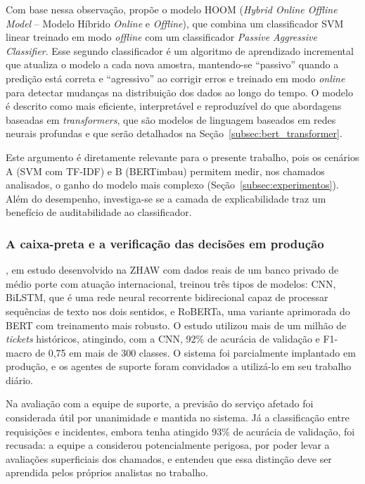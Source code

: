 \documentclass[
    12pt,                %
    openright,           %
    oneside,             %
    a4paper,             %
    english,             %
    brazil               %
]{abntex2}
\begin{document}
Com base nessa observação,  propõe o modelo HOOM (\textit{Hybrid Online Offline Model} -- Modelo Híbrido \textit{Online} e \textit{Offline}), que combina um classificador SVM linear treinado em modo \textit{offline} com um classificador \textit{Passive Aggressive Classifier}. Esse segundo classificador 
é um algoritmo de aprendizado incremental que atualiza o modelo a cada nova amostra, mantendo-se ``passivo'' quando a predição está correta e ``agressivo'' ao corrigir erros e treinado em modo 
\textit{online} para detectar mudanças na distribuição dos dados ao longo do tempo. O modelo é descrito como mais eficiente, interpretável e reproduzível 
do que abordagens baseadas em \textit{transformers}, que são modelos 
de linguagem baseados em redes neurais profundas e que serão 
detalhados na Seção~\ref{subsec:bert_transformer}.

Este argumento é diretamente relevante para o presente trabalho, pois os cenários A (SVM com TF-IDF) e B (BERTimbau) permitem medir, nos chamados analisados, o ganho do modelo mais complexo (Seção~\ref{subsec:experimentos}). Além do desempenho, investiga-se se a camada de explicabilidade traz um benefício de auditabilidade ao classificador.


\subsubsection{A caixa-preta e a verificação das decisões em produção}
\label{subsubsec:helpdesk_caixapreta}

, em estudo desenvolvido na ZHAW com dados reais 
de um banco privado de médio porte com atuação internacional, treinou três tipos de modelos: CNN, 
BiLSTM, que é uma rede neural recorrente bidirecional capaz de 
processar sequências de texto nos dois sentidos, e RoBERTa, uma 
variante aprimorada do BERT com treinamento mais robusto. O estudo 
utilizou mais de um milhão de \textit{tickets} históricos, atingindo, com a CNN, 
92\% de acurácia de validação e F1-macro de 0,75 em mais de 300 
classes. O sistema foi parcialmente implantado em produção, e os agentes 
de suporte foram convidados a utilizá-lo em seu trabalho diário. 

Na avaliação com a equipe de suporte, a previsão do serviço afetado foi considerada útil por unanimidade e mantida no sistema. Já a classificação entre requisições e incidentes, embora tenha atingido 93\% de acurácia de validação, foi recusada: a equipe a considerou potencialmente perigosa, por poder levar a avaliações superficiais dos chamados, e entendeu que essa distinção deve ser aprendida pelos próprios analistas no trabalho.
\end{document}

